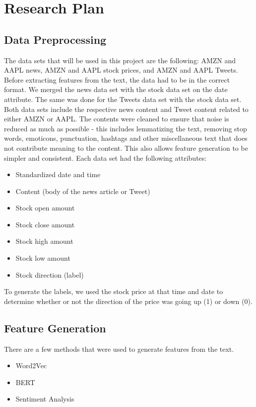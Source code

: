 \documentclass[conference]{IEEEtran}
\begin{document}
\section{Research Plan}
\subsection{Data Preprocessing}\label{AA}
The data sets that will be used in this project are the following: AMZN and AAPL news, AMZN and AAPL stock prices, and AMZN and AAPL Tweets. Before extracting features from the text, the data had to be in the correct format. We merged the news data set with the stock data set on the date attribute. The same was done for the Tweets data set with the stock data set. Both data sets include the respective news content and Tweet content related to either AMZN or AAPL. The contents were cleaned to ensure that noise is reduced as much as possible - this includes lemmatizing the text, removing stop words, emoticons, punctuation, hashtags and other miscellaneous text that does not contribute meaning to the content. This also allows feature generation to be simpler and consistent. Each data set had the following attributes:
\begin{itemize}
    \item Standardized date and time
    \item Content (body of the news article or Tweet)
    \item Stock open amount
    \item Stock close amount
    \item Stock high amount
    \item Stock low amount
    \item Stock direction (label)
\end{itemize}
To generate the labels, we used the stock price at that time and date to determine whether or not the direction of the price was going up (1) or down (0).

\subsection{Feature Generation}
There are a few methods that were used to generate features from the text.
\begin{itemize}
    \item Word2Vec
    \item BERT
    \item Sentiment Analysis
\end{itemize}
\end{document}
